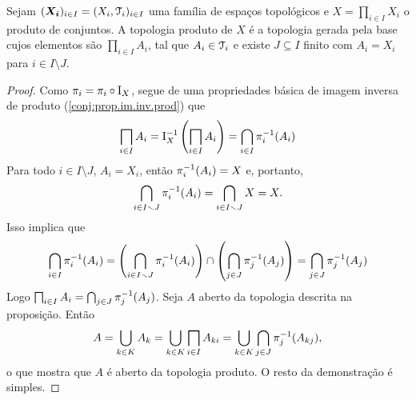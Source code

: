 \begin{proposition}
Sejam $(\bm{X_i})_{i \in I} = (X_i,\mathcal{T}_i)_{i \in I}$ uma família de espaços topológicos e $X = \prod_{i \in I} X_i$ o produto de conjuntos. A topologia produto de $X$ é a topologia gerada pela base cujos elementos são $\prod_{i \in I} A_i$, tal que $A_i \in \mathcal{T}_i$ e existe $J \subseteq I$ finito com $A_i = X_i$ para $i \in I \setminus J$.
\end{proposition}
\begin{proof}
Como $\pi_i = \pi_i \circ \mathrm{I}_X$, segue de uma propriedades básica de imagem inversa de produto (\ref{conj:prop.im.inv.prod}) que
	\begin{equation*}
	\prod_{i \in I} A_i = \Id_X\inv \left(\prod_{i \in I} A_i\right) = \bigcap_{i \in I} \pi_i\inv(A_i)
	\end{equation*}
Para todo $i \in I \setminus J$, $A_i=X_i$, então $\pi_i^{-1}(A_i)=X$ e, portanto,
	\begin{equation*}
	\bigcap_{i \in I\smallsetminus J} \pi_i^{-1}(A_i) = \bigcap_{i \in I\smallsetminus J} X = X.
	\end{equation*}
Isso implica que
	\begin{equation*}
	\bigcap_{i \in I} \pi_i^{-1}(A_i) = \left(\bigcap_{i \in I\smallsetminus J} \pi_i^{-1}(A_i)\right) \cap \left(\bigcap_{j \in J} \pi_j^{-1}(A_j)\right) =  \bigcap_{j \in J} \pi_j^{-1}(A_j)
	\end{equation*}
Logo $\prod_{i \in I} A_i = \bigcap_{j \in J} \pi_j\inv(A_j)$. Seja $A$ aberto da topologia descrita na proposição. Então
	\begin{equation*}
	A = \bigcup_{k \in K} A_k = \bigcup_{k \in K}\prod_{i \in I} A_{ki} = \bigcup_{k \in K}\bigcap_{j \in J} \pi_j\inv (A_{kj}),
	\end{equation*}
o que mostra que $A$ é aberto da topologia produto. O resto da demonstração é simples.
\end{proof}

